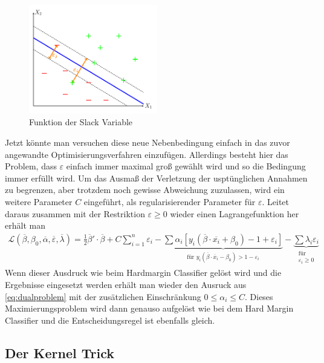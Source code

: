 \documentclass[
]{article}
\begin{document}
\begin{figure}[htb]
\centering
\includegraphics[width=0.5\textwidth,trim=0.5cm 0.5cm 0.5cm 0.5cm]{Images/slackvariable.pdf} 
        \caption{Funktion der Slack Variable}
        \label{fig:slackvariable}
\end{figure}

Jetzt könnte man versuchen diese neue Nebenbedingung einfach in das
zuvor angewandte Optimisierungsverfahren einzufügen. Allerdings besteht
hier das Problem, dass \(\varepsilon\) einfach immer maximal groß
gewählt wird und so die Bedingung immer erfüllt wird. Um das Ausmaß der
Verletzung der usptünglichen Annahmen zu begrenzen, aber trotzdem noch
gewisse Abweichung zuzulassen, wird ein weitere Parameter \(C\)
eingeführt, als regularisierender Parameter für \(\varepsilon\). Leitet
daraus zusammen mit der Restriktion \(\varepsilon\ge0\) wieder einen
Lagrangefunktion her erhält man \begin{align}
\mathcal{L}(\overline\beta,\beta_0,\overline\alpha,\overline\varepsilon,\overline\lambda)=\frac{1}{2}\overline\beta'\cdot \overline\beta + C \sum_{i=1}^{n}\varepsilon_i-\underbrace{\sum \alpha_i[y_i(\overline\beta \cdot \overline{x_i}+\beta_0)-1+\varepsilon_i]}_{\text{für }y_i(\overline\beta \cdot \overline{x}_i-\beta_0)>1- \varepsilon_i}-\underbrace{\sum \lambda_i \varepsilon_i }_{\substack{\text{für}\\ \varepsilon_i \ge 0}}
\end{align} Wenn dieser Ausdruck wie beim Hardmargin Classifier gelöst
wird und die Ergebnisse eingesetzt werden erhält man wieder den Ausruck
aus \eqref{eq:dualproblem} mit der zusätzlichen Einschränkung
\(0\le \alpha_i \le C\). Dieses Maximierungsproblem wird dann genauso
aufgelöst wie bei dem Hard Margin Classifier und die Entscheidungsregel
ist ebenfalls gleich.

\subsection{Der Kernel Trick}
\end{document}
